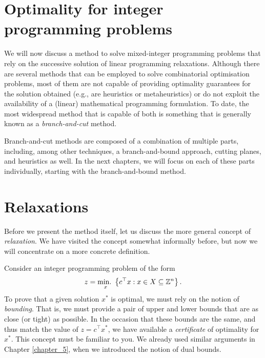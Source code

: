 
\section{Optimality for integer programming problems}

We will now discuss a method to solve mixed-integer programming problems that rely on the successive solution of linear programming relaxations. Although there are several methods that can be employed to solve combinatorial optimisation problems, most of them are not capable of providing optimality guarantees for the solution obtained (e.g., are heuristics or metaheuristics) or do not exploit the availability of a (linear) mathematical programming formulation. To date, the most widespread method that is capable of both is something that is generally known as a \emph{branch-and-cut} method.

Branch-and-cut methods are composed of a combination of multiple parts, including, among other techniques, a branch-and-bound approach, cutting planes, and heuristics as well. In the next chapters, we will focus on each of these parts individually, starting with the branch-and-bound method.


\section{Relaxations}

Before we present the method itself, let us discuss the more general concept of \emph{relaxation}. We have visited the concept somewhat informally before, but now we will concentrate on a more concrete definition.

Consider an integer programming problem of the form
%
\begin{equation*}
	z = \mathop{\text{min.~}}_x \left\{ c^\top x : x \in X \subseteq \mathbb{Z}^n \right \}.
\end{equation*}
%
To prove that a given solution $x^*$ is optimal, we must rely on the notion of \emph{bounding}. That is, we must provide a pair of upper and lower bounds that are as close (or tight) as possible. In the occasion that these bounds are the same, and thus match the value of $z = c^\top x^*$, we have available a \emph{certificate} of optimality for $x^*$. This concept must be familiar to you. We already used similar arguments in Chapter \ref{chapter_5}, when we introduced the notion of dual bounds.

